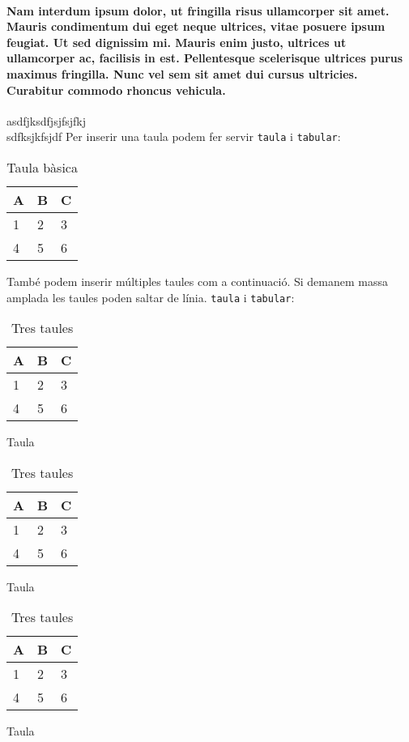 \paragraph{Nam interdum ipsum dolor, ut fringilla risus ullamcorper sit amet. Mauris condimentum dui eget neque ultrices, vitae posuere ipsum feugiat. Ut sed dignissim mi. Mauris enim justo, ultrices ut ullamcorper ac, facilisis in est. Pellentesque scelerisque ultrices purus maximus fringilla. Nunc vel sem sit amet dui cursus ultricies. Curabitur commodo rhoncus vehicula.}
asdfjksdfjsjfsjfkj\\
\newline
sdfksjkfsjdf
%
Per inserir una taula podem fer servir \verb|taula| i \verb|tabular|:
%
\begin{table}[h]
\centering
\begin{tabular}{l | l | l}
A & B & C \\
\hline
1 & 2 & 3 \\
4 & 5 & 6
\end{tabular}
\caption{Taula bàsica}
\label{tab:abc}
\end{table}
%
%
També podem inserir múltiples taules com a continuació. Si demanem massa amplada les taules poden saltar de línia. \verb|taula| i \verb|tabular|:
%
\begin{table}[h]
	\begin{subtable}[h]{0.45\textwidth}
		\centering
		\begin{tabular}{l | l | l}
		A & B & C \\
		\hline
		1 & 2 & 3 \\
		4 & 5 & 6
		\end{tabular}
		\caption{Taula}
		\label{tab:abc}
	\end{subtable}
	\hfill
		\begin{subtable}[h]{0.45\textwidth}
		\centering
		\begin{tabular}{l | l | l}
		A & B & C \\
		\hline
		1 & 2 & 3 \\
		4 & 5 & 6
		\end{tabular}
		\caption{Taula}
		\label{tab:abc}
	\end{subtable}
	\hfill
		\begin{subtable}[h]{0.45\textwidth}
		\centering
		\begin{tabular}{l | l | l}
		A & B & C \\
		\hline
		1 & 2 & 3 \\
		4 & 5 & 6
		\end{tabular}
		\caption{Taula}
		\label{tab:abc}
	\end{subtable} 
	\caption{Tres taules}
	\label{tab:temps}
\end{table}
